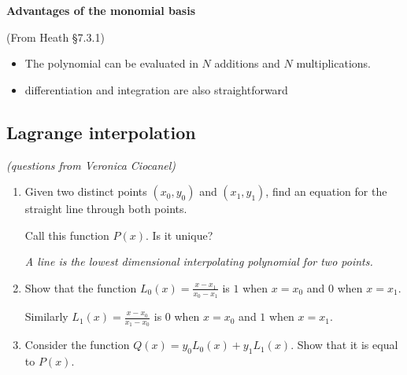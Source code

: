 \documentclass[12pt,letterpaper,noanswers]{exam}
\def\dsst{\displaystyle}
\begin{document}
\noindent\textbf{Advantages of the monomial basis}
\begin{tcolorbox}
(From Heath \S 7.3.1)
\begin{itemize}
\itemsep0pt
    \item 
    
    The polynomial can be evaluated in $N$ additions and $N$ multiplications.
    
    \item differentiation and integration are also straightforward
   
\end{itemize}

\end{tcolorbox}

\subsection*{Lagrange interpolation}
\emph{(questions from Veronica Ciocanel)}
\begin{enumerate}[resume=classQ]

\item Given two distinct points $(x_0,y_0)$ and $(x_1,y_1)$, find an equation for the
straight line through both points. 

Call this function $P(x)$.  Is it unique?

\emph{A line is the lowest dimensional interpolating polynomial for two points.}

\vspace{1in}

\item Show that the function $\dsst{L_0(x) = \frac{x-x_1}{x_0-x_1}}$ is $1$
when $x=x_0$ and $0$ when $x=x_1$.  

Similarly $\dsst{L_1(x) = \frac{x-x_0}{x_1-x_0}}$
is $0$ when $x=x_0$ and $1$ when $x=x_1$.

\vspace{1in}

\item Consider the function $Q(x) = y_0L_0(x) + y_1L_1(x)$.  Show that it is
equal to $P(x)$.

\vspace{1in}

\end{enumerate}
\end{document}

